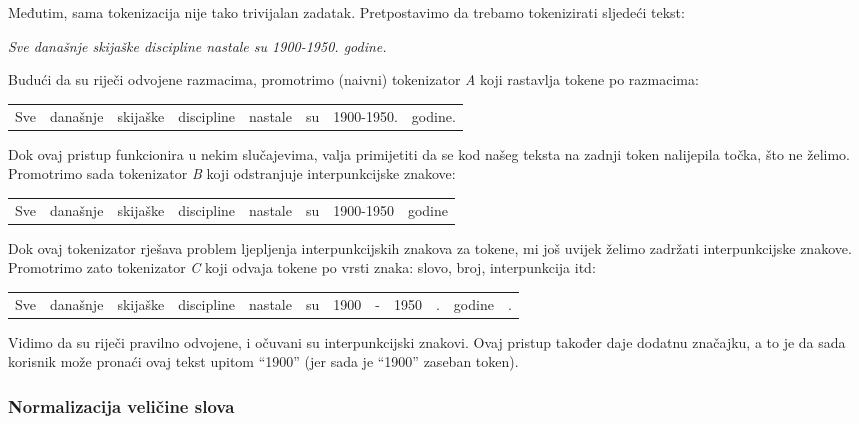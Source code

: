 \documentclass[a4paper,twoside,12pt]{scrreprt}
\newenvironment{nscenter}
 {\par\nopagebreak\centering}
 {\parskip=0pt\par\noindent\ignorespacesafterend}
\begin{document}
Međutim, sama tokenizacija nije tako trivijalan zadatak. Pretpostavimo da trebamo tokenizirati sljedeći tekst:

\begin{quoting}
  \textit{Sve današnje skijaške discipline nastale su 1900-1950. godine.}
\end{quoting}

Budući da su riječi odvojene razmacima, promotrimo (naivni) tokenizator \textit{A} koji rastavlja tokene po razmacima:

\begin{nscenter}
  \begin{tabular}{|c|c|c|c|c|c|c|c|}
    Sve & današnje & skijaške & discipline & nastale & su & 1900-1950. & godine.
  \end{tabular}
\end{nscenter}

Dok ovaj pristup funkcionira u nekim slučajevima, valja primijetiti da se kod našeg teksta na zadnji token nalijepila točka, što ne želimo. Promotrimo sada tokenizator \textit{B} koji odstranjuje interpunkcijske znakove:

\begin{nscenter}
  \begin{tabular}{|c|c|c|c|c|c|c|c|}
    Sve & današnje & skijaške & discipline & nastale & su & 1900-1950 & godine
  \end{tabular}
\end{nscenter}

Dok ovaj tokenizator rješava problem ljepljenja interpunkcijskih znakova za tokene, mi još uvijek želimo zadržati interpunkcijske znakove. Promotrimo zato tokenizator \textit{C} koji odvaja tokene po vrsti znaka: slovo, broj, interpunkcija itd:

\begin{nscenter}
  \begin{tabular}{|c|c|c|c|c|c|c|c|c|c|c|c|}
    Sve & današnje & skijaške & discipline & nastale & su & 1900 & - & 1950 & . & godine & .
  \end{tabular}
\end{nscenter}

Vidimo da su riječi pravilno odvojene, i očuvani su interpunkcijski znakovi. Ovaj pristup također daje dodatnu značajku, a to je da sada korisnik može pronaći ovaj tekst upitom ``1900'' (jer sada je ``1900'' zaseban token).

\subsubsection{Normalizacija veličine slova}
\end{document}
